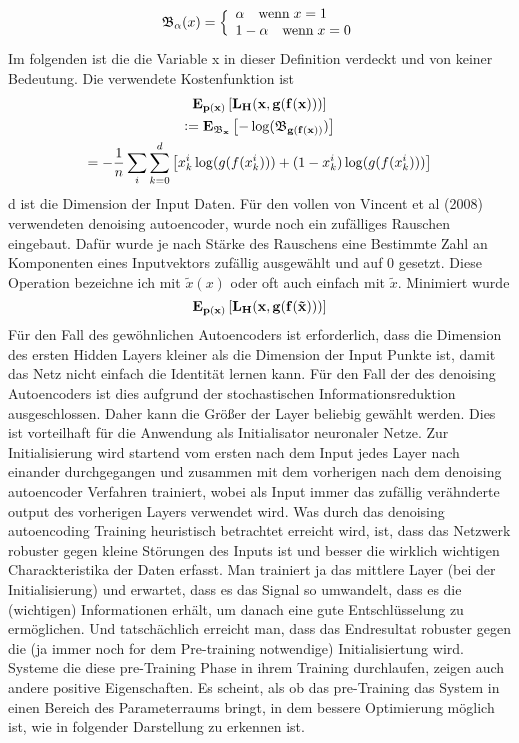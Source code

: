 \documentclass[12pt]{article}
\begin{document}
\begin{gather*}\mathfrak{B}_\alpha(x)=\Bigl\{\begin{array}{l}\alpha\quad\text{wenn}\;x=1\\
    1-\alpha\quad\text{wenn}\;x=0\end{array}\end{gather*}
Im folgenden ist die die Variable x in dieser Definition verdeckt und von keiner Bedeutung. Die verwendete Kostenfunktion ist
\begin{gather*}
    \bf{E}_{p(x)}\left[L_H(x,g(f(x)))\right]\\
    \vcentcolon=\bf{E}_{\mathfrak{B}_x}\left[-\log(\mathfrak{B}_{g(f(x))})\right]\\
    =-\frac{1}{n}\sum_i\sum_{k=0}^d\left[x_k^i\log(g(f(x_k^i)))+(1-x_k^i)\log(g(f(x_k^i)))\right]
\end{gather*}
d ist die Dimension der Input Daten. Für den vollen von Vincent et al (2008) verwendeten denoising autoencoder, wurde noch ein zufälliges Rauschen eingebaut. Dafür wurde je nach Stärke des Rauschens eine Bestimmte Zahl an Komponenten eines Inputvektors zufällig ausgewählt und auf 0 gesetzt. Diese Operation bezeichne ich mit $\tilde{x}(x)$ oder oft auch einfach mit $\tilde{x}$. Minimiert wurde 
$$\bf{E}_{p(x)}\left[L_H(x,g(f(\tilde{x})))\right]$$
Für den Fall des gewöhnlichen Autoencoders ist erforderlich, dass die Dimension des ersten Hidden Layers kleiner als die Dimension der Input Punkte ist, damit das Netz nicht einfach die Identität lernen kann. Für den Fall der des denoising Autoencoders ist dies aufgrund der stochastischen Informationsreduktion ausgeschlossen. Daher kann die Größer der Layer beliebig gewählt werden. Dies ist vorteilhaft für die Anwendung als Initialisator neuronaler Netze. Zur Initialisierung wird startend vom ersten nach dem Input jedes Layer nach einander durchgegangen und zusammen mit dem vorherigen nach dem denoising autoencoder Verfahren trainiert, wobei als Input immer das zufällig verähnderte output des vorherigen Layers verwendet wird.\newline
Was durch das denoising autoencoding Training heuristisch betrachtet erreicht wird, ist, dass das Netzwerk robuster gegen kleine Störungen des Inputs ist und besser die wirklich wichtigen Charackteristika der Daten erfasst. Man trainiert ja das mittlere Layer (bei der Initialisierung) und erwartet, dass es das Signal so umwandelt, dass es die (wichtigen) Informationen erhält, um danach eine gute Entschlüsselung zu ermöglichen. 
Und tatschächlich erreicht man, dass das Endresultat robuster gegen die (ja immer noch for dem Pre-training notwendige) Initialisiertung wird. Systeme die diese pre-Training Phase in ihrem Training durchlaufen, zeigen auch andere positive Eigenschaften. Es scheint, als ob das pre-Training das System in einen Bereich des Parameterraums bringt, in dem bessere Optimierung möglich ist, wie in folgender Darstellung zu erkennen ist.
\end{document}
